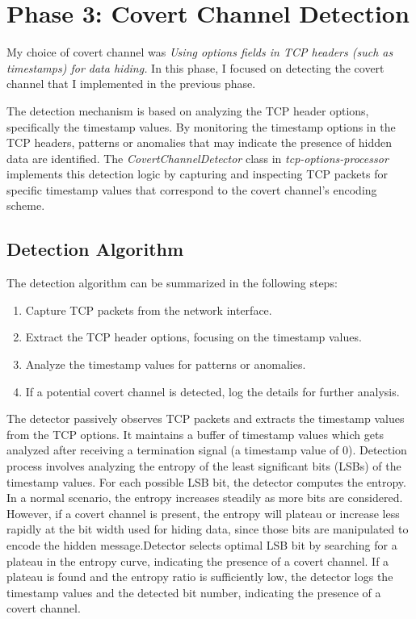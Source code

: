 \documentclass[10pt,a4paper]{article}
\begin{document}
\section*{Phase 3: Covert Channel Detection}
My choice of covert channel was \textit{Using options fields in TCP headers (such as timestamps) for data hiding.} 
In this phase, I focused on detecting the covert channel that I implemented in the previous phase.  

The detection mechanism is based on analyzing the TCP header options, specifically the timestamp values.
 By monitoring the timestamp options in the TCP headers, patterns or anomalies that may indicate the presence of hidden data are identified.
  The \textit{CovertChannelDetector} class in \textit{tcp-options-processor} implements this detection logic by capturing and inspecting TCP packets for specific timestamp values that correspond to the covert channel's encoding scheme.

\subsection*{Detection Algorithm}
The detection algorithm can be summarized in the following steps:
\begin{enumerate}
    \item Capture TCP packets from the network interface.
    \item Extract the TCP header options, focusing on the timestamp values.
    \item Analyze the timestamp values for patterns or anomalies.
    \item If a potential covert channel is detected, log the details for further analysis.
\end{enumerate}

The detector passively observes TCP packets and extracts the timestamp values from the TCP options. 
It maintains a buffer of timestamp values which gets analyzed after receiving a termination signal (a timestamp value of 0).
Detection process involves analyzing the entropy of the least significant bits (LSBs) of the timestamp values. 
For each possible LSB bit, the detector computes the entropy. In a normal scenario, the entropy increases steadily as more bits are considered.
However, if a covert channel is present, the entropy will plateau or increase less rapidly at the bit width used for hiding data, since those bits are manipulated to encode the hidden message.Detector selects optimal LSB bit by searching for a plateau in the entropy curve, indicating the presence of a covert channel.
If a plateau is found and the entropy ratio is sufficiently low, the detector logs the timestamp values and the detected bit number, indicating the presence of a covert channel.
\end{document}
